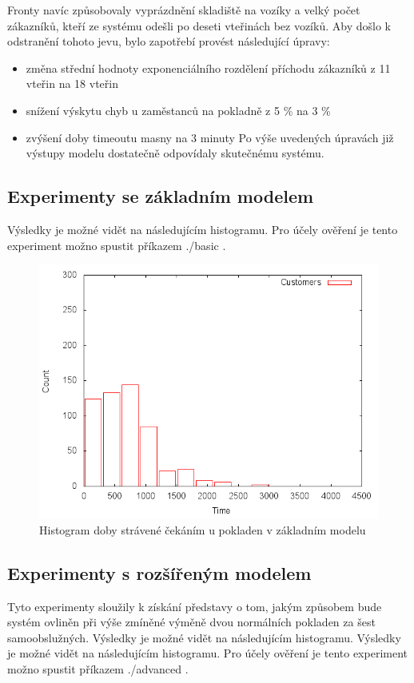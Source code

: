 \documentclass[12pt,a4paper,titlepage]{article}
\begin{document}
Fronty navíc způsobovaly vyprázdnění skladiště na vozíky a velký počet zákazníků, kteří ze systému odešli po deseti vteřinách bez vozíků. Aby došlo k odstranění tohoto jevu, bylo zapotřebí provést následující úpravy:
\begin{itemize}
\item změna střední hodnoty exponenciálního rozdělení příchodu zákazníků z 11 vteřin na 18 vteřin
\item snížení výskytu chyb u zaměstanců na pokladně z 5 \% na 3 \%
\item zvýšení doby timeoutu masny na 3 minuty
Po výše uvedených úpravách již výstupy modelu dostatečně odpovídaly skutečnému systému. 
\end{itemize}
\subsection{Experimenty se základním modelem}
Výsledky je možné vidět na následujícím histogramu. Pro účely ověření je tento experiment možno spustit příkazem ./basic .

\begin{figure}[h]
\centering
\includegraphics[scale=0.75]{basic}
\caption{Histogram doby strávené čekáním u pokladen v základním modelu}
\end{figure}

\subsection{Experimenty s rozšířeným modelem}
Tyto experimenty sloužily k získání představy o tom, jakým způsobem bude systém ovliněn při výše zmíněné výměně dvou normálních pokladen za šest samoobslužných. Výsledky je možné vidět na následujícím histogramu. Výsledky je možné vidět na následujícím histogramu. Pro účely ověření je tento experiment možno spustit příkazem ./advanced .
\end{document}
